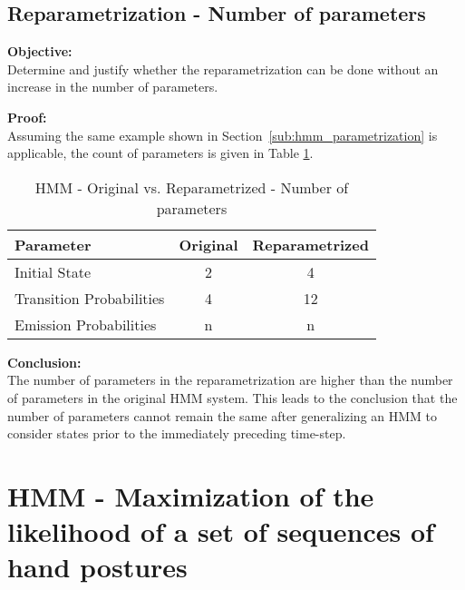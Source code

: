 \documentclass[parskip=half]{scrartcl}
\begin{document}


    \subsection{Reparametrization - Number of parameters} %
    \label{sub:reparametrization_number_of_parameters}

        \textbf{Objective:}\\
        Determine and justify whether the reparametrization can be done without an increase in the number of parameters.

        \textbf{Proof:}\\
        Assuming the same example shown in Section~\ref{sub:hmm_parametrization} is applicable, the count of parameters is given in Table \ref{tab:hmm-original-vs-reparametrized}.
        \begin{table}[th]
            \centering
            \begin{tabular}{| l | c | c |}
            \hline
            \textbf{Parameter} & \textbf{Original} & \textbf{Reparametrized} \\
            \hline
            \hline
                Initial State & 2 & 4 \\
            \hline
                Transition Probabilities & 4 & 12 \\
            \hline
                Emission Probabilities & n & n \\
            \hline
            \end{tabular}
            \caption{HMM - Original vs. Reparametrized - Number of parameters}
            \label{tab:hmm-original-vs-reparametrized}
        \end{table}

        \textbf{Conclusion:}\\
        The number of parameters in the reparametrization are higher than the number of parameters in the original HMM system. This leads to the conclusion that the number of parameters cannot remain the same after generalizing an HMM to consider states prior to the immediately preceding time-step.
    



\newpage


\section{HMM - Maximization of the likelihood of a set of sequences of hand postures} %
\label{sec:hmm_maximization_of_the_likelihood_of_a_set_of_sequences_of_hand_postures}
\end{document}
